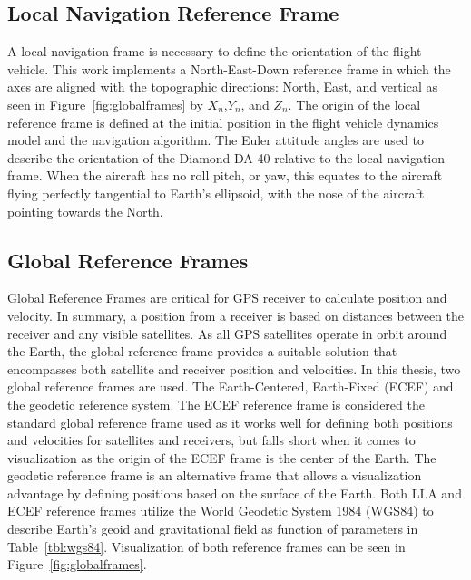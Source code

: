 \subsection{\textbf{Local Navigation Reference Frame}}
A local navigation frame is necessary to define the orientation of the flight vehicle. This work implements a North-East-Down reference frame in which the axes are aligned with the topographic directions: North, East, and vertical as seen in Figure~\ref{fig:globalframes} by \(X_n\),\(Y_n\), and \(Z_n\). The origin of the local reference frame is defined at the initial position in the flight vehicle dynamics model and the navigation algorithm. The Euler attitude angles are used to describe the orientation of the Diamond DA-40 relative to the local navigation frame. When the aircraft has no roll pitch, or yaw, this equates to the aircraft flying perfectly tangential to Earth's ellipsoid, with the nose of the aircraft pointing towards the North.

\subsection{\textbf{Global Reference Frames}}
Global Reference Frames are critical for GPS receiver to calculate position and velocity. In summary, a position from a receiver is based on distances between the receiver and any visible satellites. As all GPS satellites operate in orbit around the Earth, the global reference frame provides a suitable solution that encompasses both satellite and receiver position and velocities. In this thesis, two global reference frames are used. The Earth-Centered, Earth-Fixed (ECEF) and the geodetic reference system. The ECEF reference frame is considered the standard global reference frame used as it works well for defining both positions and velocities for satellites and receivers, but falls short when it comes to visualization as the origin of the ECEF frame is the center of the Earth. The geodetic reference frame is an alternative frame that allows a visualization advantage by defining positions based on the surface of the Earth. Both LLA and ECEF reference frames utilize the World Geodetic System 1984 (WGS84) to describe Earth's geoid and gravitational field as function of parameters in Table~\ref{tbl:wgs84}. Visualization of both reference frames can be seen in Figure~\ref{fig:globalframes}.

